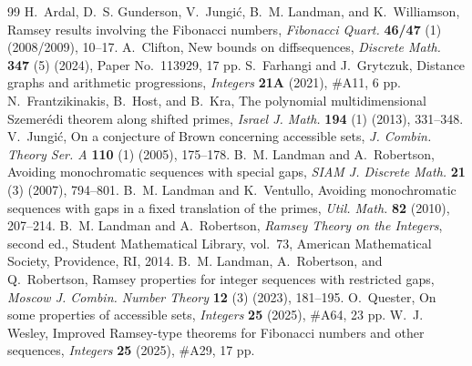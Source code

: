 \documentclass[10pt,a4paper]{amsart}
\begin{document}
\begin{thebibliography}{99}
 H.~Ardal, D.~S. Gunderson, V.~Jungi{\'c}, B.~M. Landman, and K.~Williamson, Ramsey results involving the {Fibonacci} numbers, \textit{Fibonacci Quart.} \textbf{46/47} (1) (2008/2009), 10--17.
 A.~Clifton, New bounds on diffsequences, \textit{Discrete Math.} \textbf{347} (5) (2024), Paper No.~113929, 17 pp.
 S.~Farhangi and J.~Grytczuk, Distance graphs and arithmetic progressions, \textit{Integers} \textbf{21A} (2021), \#A11, 6 pp.
 N.~Frantzikinakis, B.~Host, and B.~Kra, The polynomial multidimensional Szemer{\'e}di theorem along shifted primes, \textit{Israel J. Math.} \textbf{194} (1) (2013), 331--348.
 V.~Jungi{\'c}, On a conjecture of {Brown} concerning accessible sets, \textit{J. Combin. Theory Ser. A} \textbf{110} (1) (2005), 175--178.
 B.~M. Landman and A.~Robertson, Avoiding monochromatic sequences with special gaps, \textit{SIAM J. Discrete Math.} \textbf{21} (3) (2007), 794--801.
 B.~M. Landman and K.~Ventullo, Avoiding monochromatic sequences with gaps in a fixed translation of the primes, \textit{Util. Math.} \textbf{82} (2010), 207--214.
 B.~M. Landman and A.~Robertson, \textit{Ramsey Theory on the Integers}, second ed., Student Mathematical Library, vol.~73, American Mathematical Society, Providence, RI, 2014.
 B.~M. Landman, A.~Robertson, and Q.~Robertson, Ramsey properties for integer sequences with restricted gaps, \textit{Moscow J. Combin. Number Theory} \textbf{12} (3) (2023), 181--195.
 O.~Quester, On some properties of accessible sets, \textit{Integers} \textbf{25} (2025), \#A64, 23 pp.
 W.~J. Wesley, Improved {Ramsey}-type theorems for {Fibonacci} numbers and other sequences, \textit{Integers} \textbf{25} (2025), \#A29, 17 pp.
\end{thebibliography}
\end{document}
